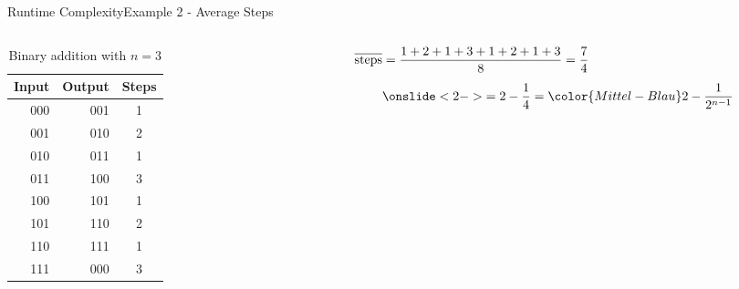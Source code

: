 
\begin{frame}{Runtime Complexity}{Example 2 - Average Steps}
  \vspace{-3em}
  \begin{columns}
    \begin{column}{0.5\linewidth}
      \begin{table}[!h]%
        \caption{Binary addition with $n=3$}%
        \label{tab:runtime:binary_addition_three}%
        \begin{tabular}{rrc}%
          Input & Output & Steps\\
          \midrule
          000 & 001 & 1\\
          001 & 010 & 2\\
          010 & 011 & 1\\
          011 & 100 & 3\\
          \midrule
          100 & 101 & 1\\
          101 & 110 & 2\\
          110 & 111 & 1\\
          111 & 000 & 3
        \end{tabular}
      \end{table}
    \end{column}
    \begin{column}{0.5\linewidth}
      \begin{align*}
        \overline{\text{steps}}
          &= \frac{1+2+1+3+1+2+1+3}{8} = \frac{7}{4}\\[0.5em]
   {} &\onslide<2->{= 2 - \frac{1}{4} = {\color{Mittel-Blau}2 - \frac{1}{2^{n-1}}}}
      \end{align*}\\
    \end{column}
  \end{columns}
\end{frame}




